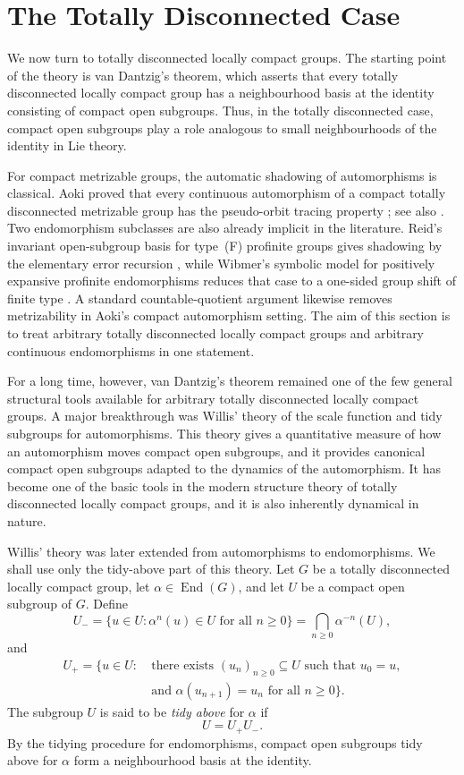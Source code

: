 \documentclass[12pt]{amsart}
\theoremstyle{definition}
\numberwithin{equation}{section}
\theoremstyle{remark}
\begin{document}
\section{The Totally Disconnected Case}\label{tdlc}

We now turn to totally disconnected locally compact groups. The starting
point of the theory is van Dantzig's theorem, which asserts that every
totally disconnected locally compact group has a neighbourhood basis at the
identity consisting of compact open subgroups. Thus, in the totally
disconnected case, compact open subgroups play a role analogous to small
neighbourhoods of the identity in Lie theory.

For compact metrizable groups, the automatic shadowing of automorphisms is
classical. Aoki proved that every continuous automorphism of a compact
totally disconnected metrizable group has the pseudo-orbit tracing
property \cite[Application~2, pp.~170--172]{AokiSplitting1985}; see also
\cite[Theorem~D]{AokiDense1985}. Two endomorphism subclasses are also already
implicit in the literature. Reid's invariant open-subgroup basis for
type~(F) profinite groups gives shadowing by the elementary error recursion
\cite[Definition~3.1 and Proposition~3.2]{Reid2014}, while Wibmer's symbolic
model for positively expansive profinite endomorphisms reduces that case to
a one-sided group shift of finite type
\cite[Proposition~2.1 and Lemma~3.3]{Wibmer2022}. A standard
countable-quotient argument likewise removes metrizability in Aoki's compact
automorphism setting. The aim of this section is to treat arbitrary totally
disconnected locally compact groups and arbitrary continuous endomorphisms
in one statement.

For a long time, however, van Dantzig's theorem remained one of the few
general structural tools available for arbitrary totally disconnected
locally compact groups. A major breakthrough was Willis' theory \cite{Willis1994,Willis2001} of the scale
function and tidy subgroups for automorphisms. This theory gives a
quantitative measure of how an automorphism moves compact open subgroups,
and it provides canonical compact open subgroups adapted to the dynamics of
the automorphism. It has become one of the basic tools in the modern
structure theory of totally disconnected locally compact groups, and it is
also inherently dynamical in nature.

Willis' theory was later extended from automorphisms to endomorphisms. We
shall use only the tidy-above part of this theory. Let $G$ be a totally
disconnected locally compact group, let $\alpha\in\operatorname{End}(G)$,
and let $U$ be a compact open subgroup of $G$. Define
\[
U_-=\{u\in U:\alpha^n(u)\in U\text{ for all }n\geq 0\}=\bigcap_{n\geq 0} \alpha^{-n}(U),
\]
and
\[
\begin{aligned}
U_+=\{u\in U:\ &\text{there exists }(u_n)_{n\geq 0}\subseteq U
\text{ such that }u_0=u,\\
&\text{and }\alpha(u_{n+1})=u_n\text{ for all }n\geq 0\}.
\end{aligned}
\]
The subgroup $U$ is said to be \emph{tidy above} for $\alpha$ if
\[
U=U_+U_-.
\]
By the tidying procedure for endomorphisms, compact open subgroups tidy
above for $\alpha$ form a neighbourhood basis at the identity.
\end{document}

